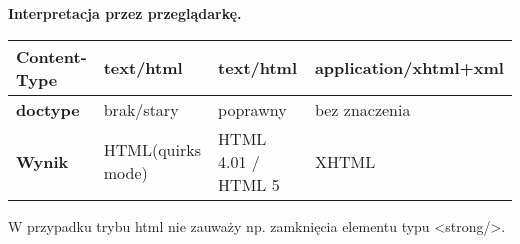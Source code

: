 \documentclass[../main.tex]{subfiles}
\begin{document}
    \textbf{Interpretacja przez przeglądarkę.}
    \begin{table}[H]
        \begin{center}
            \begin{tabular}{|p{4cm}|p{4cm}|p{4cm}|p{4cm}|}
                \hline
                \textbf{Content-Type} & text/html & text/html & application/xhtml+xml\\
                \hline
                \textbf{doctype} & brak/stary & poprawny & bez znaczenia\\
                \hline
                \textbf{Wynik} & HTML(quirks mode) & HTML 4.01 / HTML 5 & XHTML\\
                \hline
            \end{tabular}
        \end{center}
    \end{table}
    W przypadku trybu html nie zauważy np. zamknięcia elementu typu <strong/>.
\end{document}
